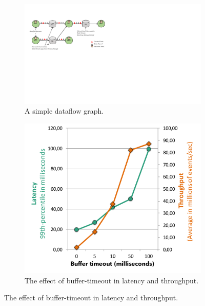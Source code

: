 \begin{figure}[t!]
\begin{minipage}{1.1\linewidth}
      \centering
       \hspace{-0.1\linewidth}
      \begin{minipage}{0.55\linewidth}
        \begin{figure}[H]
        \centering
        \includegraphics[width=.999\textwidth]{figs/dataflow}
        \vspace{-5mm}
        \caption{A simple dataflow graph.}
        \label{fig:dataflow}
        \end{figure}
      \end{minipage}
      \hspace{0.03\linewidth}
      \begin{minipage}{0.32\linewidth}
          \begin{figure}[H]
				\includegraphics[width=.99\textwidth]{figs/latency-throughput.pdf}
				\vspace{-7mm}
    			\caption{The effect of buffer-timeout in latency and throughput.}
    			\label{fig:latency-throughput}
          \end{figure}
      \end{minipage}
  \end{minipage}
\end{figure}


